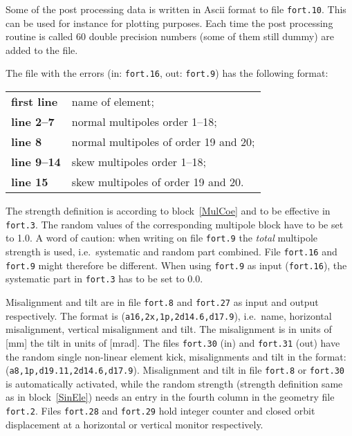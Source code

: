 Some of the post processing data is written in Ascii format to file \texttt{fort.10}.
This can be used for instance for plotting purposes.
Each time the post processing routine is called 60 double precision numbers (some of them still dummy) are added to the file.

The file with the errors (in: \texttt{fort.16}, out: \texttt{fort.9}) has the following format:

\bigskip
\begin{tabular}{ll}
    \textbf{first line} & name of element; \\
    \textbf{line 2--7}  & normal multipoles order 1--18; \\
    \textbf{line 8}     & normal multipoles of order 19 and 20; \\
    \textbf{line 9--14} & skew multipoles order 1--18; \\
    \textbf{line 15}    & skew multipoles of order 19 and 20.
\end{tabular}

\bigskip
The strength definition is according to block~\ref{MulCoe} and to be effective in \texttt{fort.3}.
The random values of the corresponding multipole block have to be set to 1.0.
A word of caution: when writing on file \texttt{fort.9} the \textit{total} multipole strength is used, i.e.\ systematic and random part combined.
File \texttt{fort.16} and \texttt{fort.9} might therefore be different.
When using \texttt{fort.9} as input (\texttt{fort.16}), the systematic part in \texttt{fort.3} has to be set to 0.0.

Misalignment and tilt are in file \texttt{fort.8} and \texttt{fort.27} as input and output respectively.
The format is (\texttt{a16,2x,1p,2d14.6,d17.9}), i.e.\ name, horizontal misalignment, vertical misalignment and tilt.
The misalignment is in units of [mm] the tilt in units of [mrad].
The files \texttt{fort.30} (in) and \texttt{fort.31} (out) have the random single non-linear element kick, misalignments and tilt in the format: (\texttt{a8,1p,d19.11,2d14.6,d17.9}).
Misalignment and tilt in file \texttt{fort.8} or \texttt{fort.30} is automatically activated, while the random strength (strength definition same as in block~\ref{SinEle}) needs an entry in the fourth column in the geometry file \texttt{fort.2}.
Files \texttt{fort.28} and \texttt{fort.29} hold integer counter and closed orbit displacement at a horizontal or vertical monitor respectively.

 \setcounter{dst}{0}

